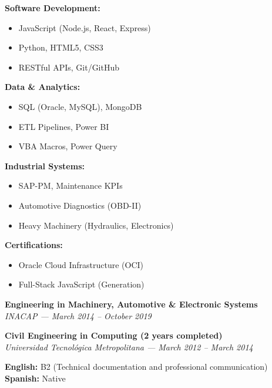 \documentclass[10pt,letterpaper]{article}
\begin{document}
\noindent
\begin{minipage}[t]{0.48\textwidth}
\textbf{Software Development:}
\begin{itemize}
    \item JavaScript (Node.js, React, Express)
    \item Python, HTML5, CSS3
    \item RESTful APIs, Git/GitHub
\end{itemize}

\vspace{0.2cm}

\textbf{Data \& Analytics:}
\begin{itemize}
    \item SQL (Oracle, MySQL), MongoDB
    \item ETL Pipelines, Power BI
    \item VBA Macros, Power Query
\end{itemize}
\end{minipage}
\hfill
\begin{minipage}[t]{0.48\textwidth}
\textbf{Industrial Systems:}
\begin{itemize}
    \item SAP-PM, Maintenance KPIs
    \item Automotive Diagnostics (OBD-II)
    \item Heavy Machinery (Hydraulics, Electronics)
\end{itemize}

\vspace{0.2cm}

\textbf{Certifications:}
\begin{itemize}
    \item Oracle Cloud Infrastructure (OCI)
    \item Full-Stack JavaScript (Generation)
\end{itemize}
\end{minipage}

\vspace{0.3cm}

\vspace{0.4cm}

\vspace{0.3cm}

\noindent \textbf{Engineering in Machinery, Automotive \& Electronic Systems} \\
\textit{INACAP — March 2014 – October 2019}

\vspace{0.2cm}

\noindent \textbf{Civil Engineering in Computing (2 years completed)} \\
\textit{Universidad Tecnológica Metropolitana — March 2012 – March 2014}

\vspace{0.4cm}


\vspace{0.3cm}

\noindent \textbf{English:} B2 (Technical documentation and professional communication) \\
\noindent \textbf{Spanish:} Native
\end{document}
